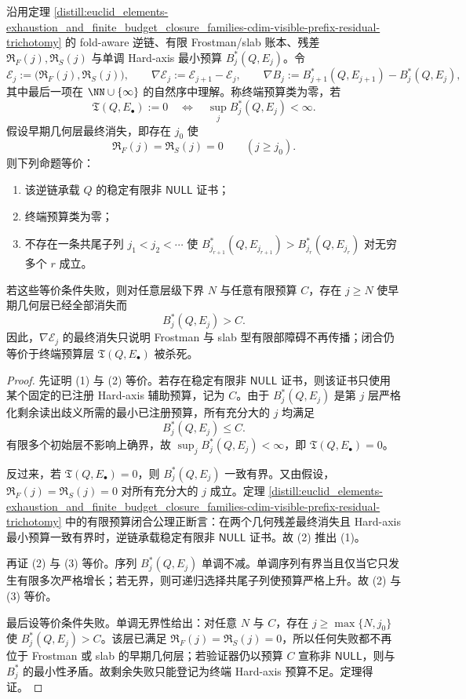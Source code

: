 \begin{theorem}\label{distill:grothendieck-cohomological_gap_filtration-cdim-terminal-budget-class}
沿用定理 \ref{distill:euclid_elements-exhaustion_and_finite_budget_closure_families-cdim-visible-prefix-residual-trichotomy} 的 fold-aware 逆链、有限 Frostman/slab 账本、残差 \(\mathfrak R_F(j),\mathfrak R_S(j)\) 与单调 Hard-axis 最小预算 \(B_j^\ast(Q,E_j)\)。令
\[
\mathcal E_j:=\bigl(\mathfrak R_F(j),\mathfrak R_S(j)\bigr),
\qquad
\nabla\mathcal E_j:=\mathcal E_{j+1}-\mathcal E_j,
\qquad
\nabla B_j:=B_{j+1}^\ast(Q,E_{j+1})-B_j^\ast(Q,E_j),
\]
其中最后一项在 \(\NN\cup\{\infty\}\) 的自然序中理解。称终端预算类为零，若
\[
\mathfrak T(Q,E_\bullet):=0
\quad\Longleftrightarrow\quad
\sup_j B_j^\ast(Q,E_j)<\infty .
\]
假设早期几何层最终消失，即存在 \(j_0\) 使
\[
\mathfrak R_F(j)=\mathfrak R_S(j)=0\qquad(j\ge j_0).
\]
则下列命题等价：
\begin{enumerate}
  \item 该逆链承载 \(Q\) 的稳定有限非 \(\mathsf{NULL}\) 证书；
  \item 终端预算类为零；
  \item 不存在一条共尾子列 \(j_1<j_2<\cdots\) 使 \(B_{j_{r+1}}^\ast(Q,E_{j_{r+1}})>B_{j_r}^\ast(Q,E_{j_r})\) 对无穷多个 \(r\) 成立。
\end{enumerate}
若这些等价条件失败，则对任意层级下界 \(N\) 与任意有限预算 \(C\)，存在 \(j\ge N\) 使早期几何层已经全部消失而
\[
B_j^\ast(Q,E_j)>C.
\]
因此，\(\nabla\mathcal E_j\) 的最终消失只说明 Frostman 与 slab 型有限部障碍不再传播；闭合仍等价于终端预算层 \(\mathfrak T(Q,E_\bullet)\) 被杀死。
\end{theorem}
\begin{proof}
先证明 (1) 与 (2) 等价。若存在稳定有限非 \(\mathsf{NULL}\) 证书，则该证书只使用某个固定的已注册 Hard-axis 辅助预算，记为 \(C\)。由于 \(B_j^\ast(Q,E_j)\) 是第 \(j\) 层严格化剩余读出歧义所需的最小已注册预算，所有充分大的 \(j\) 均满足
\[
B_j^\ast(Q,E_j)\le C.
\]
有限多个初始层不影响上确界，故 \(\sup_jB_j^\ast(Q,E_j)<\infty\)，即 \(\mathfrak T(Q,E_\bullet)=0\)。

反过来，若 \(\mathfrak T(Q,E_\bullet)=0\)，则 \(B_j^\ast(Q,E_j)\) 一致有界。又由假设，\(\mathfrak R_F(j)=\mathfrak R_S(j)=0\) 对所有充分大的 \(j\) 成立。定理 \ref{distill:euclid_elements-exhaustion_and_finite_budget_closure_families-cdim-visible-prefix-residual-trichotomy} 中的有限预算闭合公理正断言：在两个几何残差最终消失且 Hard-axis 最小预算一致有界时，逆链承载稳定有限非 \(\mathsf{NULL}\) 证书。故 (2) 推出 (1)。

再证 (2) 与 (3) 等价。序列 \(B_j^\ast(Q,E_j)\) 单调不减。单调序列有界当且仅当它只发生有限多次严格增长；若无界，则可递归选择共尾子列使预算严格上升。故 (2) 与 (3) 等价。

最后设等价条件失败。单调无界性给出：对任意 \(N\) 与 \(C\)，存在 \(j\ge\max\{N,j_0\}\) 使 \(B_j^\ast(Q,E_j)>C\)。该层已满足 \(\mathfrak R_F(j)=\mathfrak R_S(j)=0\)，所以任何失败都不再位于 Frostman 或 slab 的早期几何层；若验证器仍以预算 \(C\) 宣称非 \(\mathsf{NULL}\)，则与 \(B_j^\ast\) 的最小性矛盾。故剩余失败只能登记为终端 Hard-axis 预算不足。定理得证。
\end{proof}


\endinput
